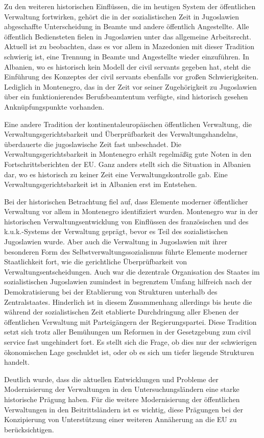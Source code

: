 Zu den weiteren historischen Einflüssen, die im heutigen System der öffentlichen Verwaltung fortwirken, gehört die in der sozialistischen Zeit in Jugoslawien abgeschaffte Unterscheidung in Beamte und andere öffentlich Angestellte. Alle öffentlich Bediensteten fielen in Jugoslawien unter das allgemeine Arbeitsrecht. Aktuell ist zu beobachten, dass es vor allem in Mazedonien mit dieser Tradition schwierig ist, eine Trennung in Beamte und Angestellte wieder einzuführen. In Albanien, wo es historisch kein Modell der civil servants gegeben hat, steht die Einführung des Konzeptes der civil servants ebenfalls vor großen Schwierigkeiten. Lediglich in Montenegro, das in der Zeit vor seiner Zugehörigkeit zu Jugoslawien über ein funktionierendes Berufsbeamtentum verfügte, sind historisch gesehen Anknüpfungspunkte vorhanden. \par
Eine andere Tradition der kontinentaleuropäischen öffentlichen Verwaltung, die Verwaltungsgerichtsbarkeit und Überprüfbarkeit des Verwaltungshandelns, überdauerte die jugoslawische Zeit fast unbeschadet. Die Verwaltungsgerichtsbarkeit in Montenegro erhält regelmäßig gute Noten in den Fortschrittsberichten der EU. Ganz anders stellt sich die Situation in Albanien dar, wo es historisch zu keiner Zeit eine Verwaltungskontrolle gab. Eine Verwaltungsgerichtsbarkeit ist in Albanien erst im Entstehen. \par
Bei der historischen Betrachtung fiel auf, dass Elemente moderner öffentlicher Verwaltung vor allem in Montenegro identifiziert wurden. Montenegro war in der historischen Verwaltungsentwicklung von Einflüssen des französischen und des k.u.k.-Systems der Verwaltung geprägt, bevor es Teil des sozialistischen Jugoslawien wurde. Aber auch die Verwaltung in Jugoslawien mit ihrer besonderen Form des Selbstverwaltungssozialismus führte Elemente moderner Staatlichkeit fort, wie die gerichtliche Überprüfbarkeit von Verwaltungsentscheidungen. Auch war die dezentrale Organisation des Staates im sozialistischen Jugoslawien zumindest in begrenztem Umfang hilfreich nach der Demokratisierung bei der Etablierung von Strukturen unterhalb des Zentralstaates. Hinderlich ist in diesem Zusammenhang allerdings bis heute die während der sozialistischen Zeit etablierte Durchdringung aller Ebenen der öffentlichen Verwaltung mit Parteigängern der Regierungspartei. Diese Tradition setzt sich trotz aller Bemühungen um Reformen in der Gesetzgebung zum civil service fast ungehindert fort. Es stellt sich die Frage, ob dies nur der schwierigen ökonomischen Lage geschuldet ist, oder ob es sich um tiefer liegende Strukturen handelt. \par
Deutlich wurde, dass die aktuellen Entwicklungen und Probleme der Modernisierung der Verwaltungen in den Untersuchungsländern eine starke historische Prägung haben. Für die weitere Modernisierung der öffentlichen Verwaltungen in den Beitrittsländern ist es wichtig, diese Prägungen bei der Konzipierung von Unterstützung einer weiteren Annäherung an die EU zu berücksichtigen.

